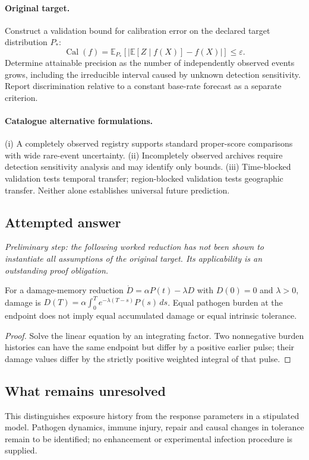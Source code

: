 \documentclass[11pt]{article}
\begin{document}
\paragraph{Original target.}
Construct a validation bound for calibration error on the declared target distribution $P_*$:
    \[\operatorname{Cal}(f)=\mathbb{E}_{P_*}\!\left[\left|\mathbb{E}[Z\mid f(X)]-f(X)\right|\right]\leq\varepsilon.
    \]
    Determine attainable precision as the number of independently observed events grows, including the irreducible interval caused by unknown detection sensitivity. Report discrimination relative to a constant base-rate forecast as a separate criterion.
\paragraph{Catalogue alternative formulations.}
(i) A completely observed registry supports standard proper-score comparisons with wide rare-event uncertainty. (ii) Incompletely observed archives require detection sensitivity analysis and may identify only bounds. (iii) Time-blocked validation tests temporal transfer; region-blocked validation tests geographic transfer. Neither alone establishes universal future prediction.
\subsection{Attempted answer}
\noindent\emph{Preliminary step: the following worked reduction has not been shown to instantiate all assumptions of the original target. Its applicability is an outstanding proof obligation.}

\begin{proposition}
For a damage-memory reduction $\dot D=\alpha P(t)-\lambda D$ with $D(0)=0$ and $\lambda>0$, damage is $D(T)=\alpha\int_0^T e^{-\lambda(T-s)}P(s)\,ds$. Equal pathogen burden at the endpoint does not imply equal accumulated damage or equal intrinsic tolerance.
\end{proposition}
\begin{proof}
Solve the linear equation by an integrating factor. Two nonnegative burden histories can have the same endpoint but differ by a positive earlier pulse; their damage values differ by the strictly positive weighted integral of that pulse.
\end{proof}
\subsection{What remains unresolved}
This distinguishes exposure history from the response parameters in a stipulated model. Pathogen dynamics, immune injury, repair and causal changes in tolerance remain to be identified; no enhancement or experimental infection procedure is supplied.
\end{document}
